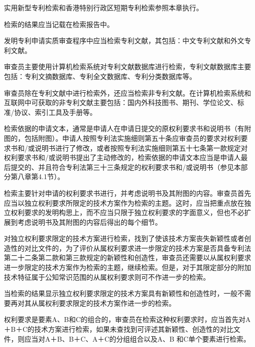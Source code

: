 实用新型专利检索和香港特别行政区短期专利检索参照本章执行。

检索的结果应当记载在检索报告中。

发明专利申请实质审查程序中应当检索专利文献，其包括：中文专利文献和外文专利文献。

审查员主要使用计算机检索系统对专利文献数据库进行检索，专利文献数据库主要包括：专利文摘数据库、专利全文数据库、专利分类数据库等。

审查员除在专利文献中进行检索外，还应当检索非专利文献。在计算机检索系统和互联网中可获取的非专利文献主要包括：国内外科技图书、期刊、学位论文、标准/协议、索引工具及手册等。

检索依据的申请文本，通常是申请人在申请日提交的原权利要求书和说明书（有附图的，包括附图）。申请人按照专利法实施细则第五十条应审查员的要求对权利要求书和/或说明书进行了修改，或者按照专利法实施细则第五十七条第一款规定对权利要求书和/或说明书提出了主动修改的，检索依据的申请文本应当是申请人最后提交的、并且符合专利法第三十三条规定的权利要求书和/或说明书（参见本部分第八章第4.1节）。

检索主要针对申请的权利要求书进行，并考虑说明书及其附图的内容。审查员首先应当以独立权利要求所限定的技术方案作为检索的主题。这时，应当把重点放在独立权利要求的发明构思上，而不应当只限于独立权利要求的字面意义，但也不必扩展到考虑说明书及其附图的内容后得出的每个细节。

对独立权利要求限定的技术方案进行检索，找到了使该技术方案丧失新颖性或者创造性的对比文件的，为了评价从属权利要求进一步限定的技术方案是否具备专利法第二十二条第二款和第三款规定的新颖性和创造性，审查员还需要以从属权利要求进一步限定的技术方案作为检索的主题，继续检索。但是，对于其限定部分的附加技术特征属于公知常识范围的从属权利要求则可不作进一步的检索。

当检索的结果显示独立权利要求限定的技术方案具有新颖性和创造性时，一般不需要再对其从属权利要求限定的技术方案作进一步的检索。

{\setlength{\parindent}{22.2bp}权利要求是要素A、B和C的组合的，审查员在检索这种权利要求时，应当首先对A＋B＋C的技术方案进行检索，如果未查找到可评述其新颖性、创造性的对比文件，则应当对A＋B、B＋C、A＋C的分组组合以及A、B 和C单个要素进行检索。\par}

